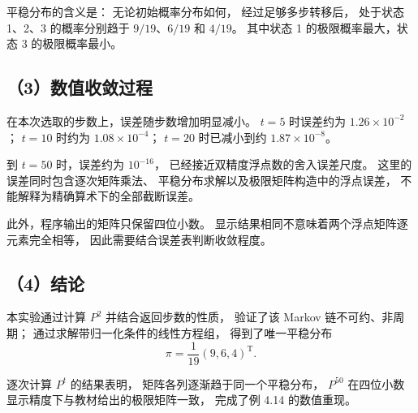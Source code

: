 \documentclass[UTF8,a4paper,11pt,fontset=fandol]{ctexart}
\begin{document}
平稳分布的含义是：
无论初始概率分布如何，
经过足够多步转移后，
处于状态 1、2、3 的概率分别趋于
$9/19$、$6/19$ 和 $4/19$。
其中状态 1 的极限概率最大，状态 3 的极限概率最小。

\subsection*{（3）数值收敛过程}

在本次选取的步数上，误差随步数增加明显减小。
$t=5$ 时误差约为 $1.26\times10^{-2}$；
$t=10$ 时约为 $1.08\times10^{-4}$；
$t=20$ 时已减小到约 $1.87\times10^{-8}$。

到 $t=50$ 时，误差约为 $10^{-16}$，
已经接近双精度浮点数的舍入误差尺度。
这里的误差同时包含逐次矩阵乘法、
平稳分布求解以及极限矩阵构造中的浮点误差，
不能解释为精确算术下的全部截断误差。

此外，程序输出的矩阵只保留四位小数。
显示结果相同不意味着两个浮点矩阵逐元素完全相等，
因此需要结合误差表判断收敛程度。

\subsection*{（4）结论}

本实验通过计算 $P^2$ 并结合返回步数的性质，
验证了该 Markov 链不可约、非周期；
通过求解带归一化条件的线性方程组，
得到了唯一平稳分布
\[
\pi=\frac1{19}(9,6,4)^{\mathrm T}.
\]

逐次计算 $P^t$ 的结果表明，
矩阵各列逐渐趋于同一个平稳分布，
$P^{50}$ 在四位小数显示精度下与教材给出的极限矩阵一致，
完成了例 4.14 的数值重现。
\end{document}
